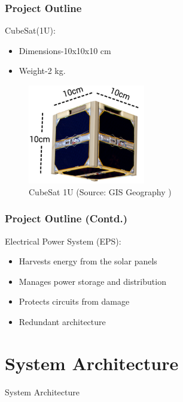 \documentclass[aspectratio=169]{beamer}
\begin{document}
\begin{frame}
	\frametitle{Project Outline	}

	\begin{minipage}{0.5\textwidth}
	CubeSat(1U):
\begin{itemize}
	
	\item Dimensions-10x10x10 cm 
	\item Weight-2 kg.
\end{itemize}
\end{minipage}
\begin{minipage}{0.3\textwidth}
		\begin{figure}
	\includegraphics[width=5.1cm]{cubes1.png}
	\begin{center}
		\caption{CubeSat 1U (Source: GIS Geography )}
	\end{center}
	\label{fig:trac2}
	
\end{figure}
	
\end{minipage}

	 \end{frame}


\begin{frame}
	\frametitle{Project Outline (Contd.)}
 	Electrical Power System (EPS):
 	\begin{itemize}
 		
 		\item Harvests energy from the solar panels
 		\item Manages power storage and distribution
 		\item Protects circuits from damage
 		\item Redundant architecture
 	\end{itemize}
\end{frame}


\section{System Architecture}
\begin{frame}{System Architecture}
	
	

	
\end{frame}
\end{document}
